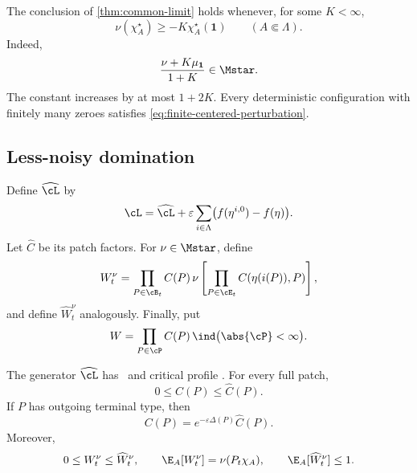 \begin{remark}
\label{rem:finite-centered-perturbations}
The conclusion of \cref{thm:common-limit} holds whenever, for some
\(K<\infty\),
\begin{equation}
  \nu(\chi_A^\star)
  \ge
  -K\chi_A^\star(\mathbf1)
  \qquad(A\Subset\Lambda).
  \label{eq:finite-centered-perturbation}
\end{equation}
Indeed,
\[
  \frac{\nu+K\mu_{\mathbf1}}{1+K}\in\Mstar.
\]
The constant increases by at most \(1+2K\). Every deterministic
configuration with finitely many zeroes satisfies
\eqref{eq:finite-centered-perturbation}.
\end{remark}

\subsection{Less-noisy domination}

\begin{notation}
\label{not:less-noisy-weights}
Define \(\widehat{\cL}\) by
\begin{equation}
  \cL
  =
  \widehat{\cL}
  +
  \varepsilon\sum_{i\in\Lambda}
  \bigl(f(\eta^{i,0})-f(\eta)\bigr).
  \label{eq:less-noisy-generator}
\end{equation}
Let \(\widehat C\) be its patch factors. For
\(\nu\in\Mstar\), define
\begin{equation}
  W_t^\nu
  =
  \prod_{P\in\cB_t}C(P)\,
  \nu\left[
    \prod_{P\in\cE_t}
    C(\eta(i(P)),P)
  \right],
  \label{eq:finite-weight}
\end{equation}
and define \(\widehat W_t^\nu\) analogously. Finally, put
\begin{equation}
  W
  =
  \prod_{P\in\cP}C(P)\,
  \ind\bigl(\abs{\cP}<\infty\bigr).
  \label{eq:limiting-weight-W}
\end{equation}
\end{notation}

\begin{lemma}
\label{lem:less-noisy-domination}
The generator \(\widehat{\cL}\) has \patchpositivity\ and critical
profile \pstar. For every full patch,
\begin{equation}
  0\le C(P)\le\widehat C(P).
  \label{eq:full-factor-comparison}
\end{equation}
If \(P\) has outgoing terminal type, then
\begin{equation}
  C(P)
  =
  e^{-\varepsilon\Delta(P)}
  \widehat C(P).
  \label{eq:exact-XO-damping}
\end{equation}
Moreover,
\begin{equation}
  0\le W_t^\nu\le\widehat W_t^\nu,
  \qquad
  \E_A[W_t^\nu]=\nu(P_t\chi_A),
  \qquad
  \E_A[\widehat W_t^\nu]\le1.
  \label{eq:weight-domination}
\end{equation}
\end{lemma}

